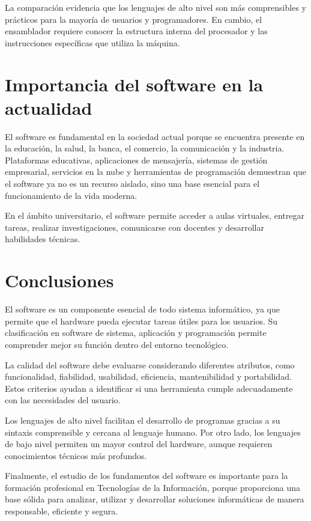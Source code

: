 \documentclass[12pt,a4paper]{article}
\begin{document}
	La comparación evidencia que los lenguajes de alto nivel son más comprensibles y prácticos para la mayoría de usuarios y programadores. En cambio, el ensamblador requiere conocer la estructura interna del procesador y las instrucciones específicas que utiliza la máquina.
	
	\section{Importancia del software en la actualidad}
	
	El software es fundamental en la sociedad actual porque se encuentra presente en la educación, la salud, la banca, el comercio, la comunicación y la industria. Plataformas educativas, aplicaciones de mensajería, sistemas de gestión empresarial, servicios en la nube y herramientas de programación demuestran que el software ya no es un recurso aislado, sino una base esencial para el funcionamiento de la vida moderna.
	
	En el ámbito universitario, el software permite acceder a aulas virtuales, entregar tareas, realizar investigaciones, comunicarse con docentes y desarrollar habilidades técnicas.
	
	\section{Conclusiones}
	
	El software es un componente esencial de todo sistema informático, ya que permite que el hardware pueda ejecutar tareas útiles para los usuarios. Su clasificación en software de sistema, aplicación y programación permite comprender mejor su función dentro del entorno tecnológico.
	
	La calidad del software debe evaluarse considerando diferentes atributos, como funcionalidad, fiabilidad, usabilidad, eficiencia, mantenibilidad y portabilidad. Estos criterios ayudan a identificar si una herramienta cumple adecuadamente con las necesidades del usuario.
	
	Los lenguajes de alto nivel facilitan el desarrollo de programas gracias a su sintaxis comprensible y cercana al lenguaje humano. Por otro lado, los lenguajes de bajo nivel permiten un mayor control del hardware, aunque requieren conocimientos técnicos más profundos.
	
	Finalmente, el estudio de los fundamentos del software es importante para la formación profesional en Tecnologías de la Información, porque proporciona una base sólida para analizar, utilizar y desarrollar soluciones informáticas de manera responsable, eficiente y segura.
	
\end{document}
